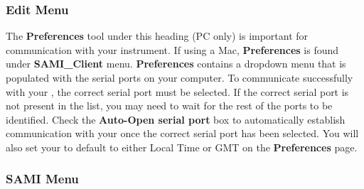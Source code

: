 \subsubsection{Edit Menu}

The \textbf{Preferences} tool under this heading (PC only) is important for communication with your instrument. If using a Mac, \textbf{Preferences} is found under \textbf{SAMI\_Client} menu. \textbf{Preferences} contains a dropdown menu that is populated with the serial ports on your computer. To communicate successfully with your \instType{}, the correct serial port must be selected. If the correct serial port is not present in the list, you may need to wait for the rest of the ports to be identified. Check the \textbf{Auto-Open serial port} box to automatically establish communication with your \instType{} once the correct serial port has been selected. You will also set your \instType{} to default to either Local Time or GMT on the \textbf{Preferences} page.


\subsubsection{SAMI Menu}

